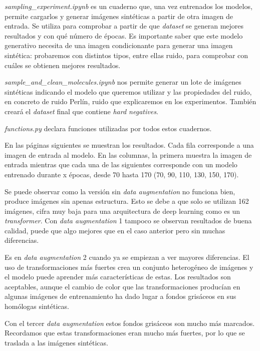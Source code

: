\noindent \textit{sampling\_experiment.ipynb} es un cuaderno que, una vez entrenados los modelos, permite cargarlos y generar imágenes sintéticas a partir de otra imagen de entrada. Se utiliza para comprobar a partir de que \textit{dataset} se generan mejores resultados y con qué número de épocas. Es importante saber que este modelo generativo necesita de una imagen condicionante para generar una imagen sintética: probaremos con distintos tipos, entre ellas ruido, para comprobar con cuáles se obtienen mejores resultados.

\noindent \textit{sample\_and\_clean\_molecules.ipynb} nos permite generar un lote de imágenes sintéticas indicando el modelo que queremos utilizar y las propiedades del ruido, en concreto de ruido Perlín, ruido que explicaremos en los experimentos. También creará el \textit{dataset} final que contiene \textit{hard negatives}.

\noindent \textit{functions.py} declara funciones utilizadas por todos estos cuadernos.

\newpage
En las páginas siguientes se muestran los resultados. Cada fila corresponde a una imagen de entrada al modelo. En las columnas, la primera muestra la imagen de entrada mientras que cada una de las siguientes corresponde con un modelo entrenado durante x épocas, desde 70 hasta 170 (70, 90, 110, 130, 150, 170).

Se puede observar como la versión sin \textit{data augmentation} no funciona bien, produce imágenes sin apenas estructura. Esto se debe a que solo se utilizan 162 imágenes, cifra muy baja para una arquitectura de deep learning como es un \textit{transformer}. Con \textit{data augmentation} 1 tampoco se observan resultados de buena calidad, puede que algo mejores que en el caso anterior pero sin muchas diferencias.

Es en \textit{data augmentation} 2 cuando ya se empiezan a ver mayores diferencias. El uso de transformaciones más fuertes crea un conjunto heterogéneo de imágenes y el modelo puede aprender más características de estas. Los resultados son aceptables, aunque el cambio de color que las transformaciones producían en algunas imágenes de entrenamiento ha dado lugar a fondos grisáceos en sus homólogas sintéticas. 

Con el tercer \textit{data augmentation} estos fondos grisáceos son mucho más marcados. Recordamos que estas transformaciones eran mucho más fuertes, por lo que se traslada a las imágenes sintéticas.


